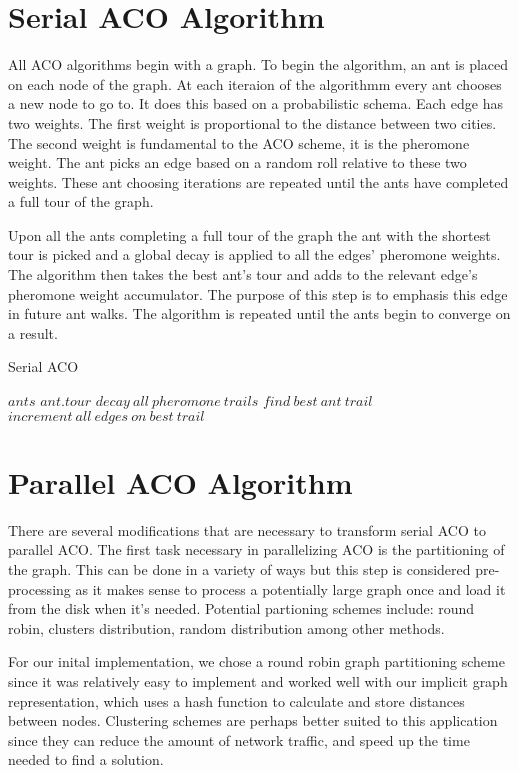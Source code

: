 \documentclass{acm_proc_article-sp}
\begin{document}
\section{Serial ACO Algorithm}
All ACO algorithms begin with a graph. To begin the algorithm, an ant is placed on each node of the graph.
At each iteraion of the algorithmm every ant chooses a new node to go to. It does this based on a probabilistic 
schema. Each edge has two weights. The first weight is proportional to the distance between two cities. The second
weight is fundamental to the ACO scheme, it is the pheromone weight. The ant picks an edge based on a random roll
relative to these two weights. These ant choosing iterations are repeated until the ants have completed a full tour
of the graph. 

Upon all the ants completing a full tour of the graph the ant with the shortest tour is picked and a global decay is
applied to all the edges' pheromone weights. The algorithm then takes the best ant's tour and adds to the relevant 
edge's pheromone weight accumulator. The purpose of this step is to emphasis this edge in future ant walks. The algorithm
is repeated until the ants begin to converge on a result. 

\caption{Serial ACO}
\begin{algorithmic}[1]
        \State $ants$  
                \State $ ant.tour $
            \EndFor
            \State $ decay\ all\ pheromone\ trails $
            \State $ find\ best\ ant\ trail $
            \State $ increment\ all\ edges\ on\ best\ trail $
        \EndWhile
    \EndProcedure
\end{algorithmic}

\section{Parallel ACO Algorithm}
There are several modifications that are necessary to transform serial ACO to parallel ACO. The first task
necessary in parallelizing ACO is the partitioning of the graph. This can be done in a variety of ways but 
this step is considered pre-processing as it makes sense to process a potentially large graph once and load it
from the disk when it's needed. Potential partioning schemes include: round robin, clusters distribution, 
random distribution among other methods.

For our inital implementation, we chose a round robin graph partitioning scheme since it was relatively easy to implement
and worked well with our implicit graph representation, which uses a hash function to calculate and store distances between
nodes. Clustering schemes are perhaps better suited to this application since they can reduce the amount of network traffic,
and speed up the time needed to find a solution.
\end{document}
